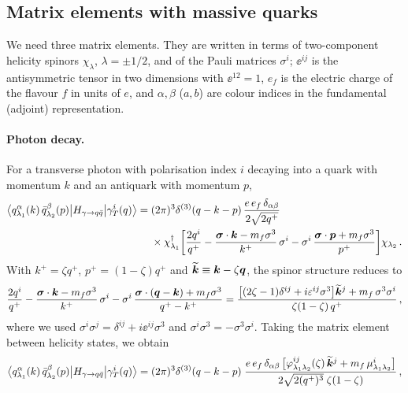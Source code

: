 \subsection{Matrix elements with massive quarks}
\label{sec:me}

We need three matrix elements. They are written in terms of two-component helicity spinors $\chi_\lambda$,
$\lambda=\pm1/2$, and of the Pauli matrices $\sigma^i$; $\ee^{ij}$ is the antisymmetric tensor in two
dimensions with $\ee^{12}=1$, $e_f$ is the electric charge of the flavour $f$ in units of $e$, and
$\alpha,\beta$ ($a,b$) are colour indices in the fundamental (adjoint) representation.

\paragraph{Photon decay.} For a transverse photon with polarisation index $i$ decaying into a quark with
momentum $k$ and an antiquark with momentum $p$,
\begin{align}
\big\langle q^\alpha_{\lambda_1}(k)\,\bar q^\beta_{\lambda_2}(p)\big|H_{\gamma\to q\bar q}\big|\gamma_T^i(q)\big\rangle
={}&(2\pi)^3\delta^{(3)}(q-k-p)\,\frac{e\,e_f\,\delta_{\alpha\beta}}{2\sqrt{2q^+}}
\nonumber\\
&\times\chi^\dagger_{\lambda_1}\bigg[\frac{2q^i}{q^+}
-\frac{\bm\sigma\cdot\bm{k}-m_f\sigma^3}{k^+}\,\sigma^i
-\sigma^i\,\frac{\bm\sigma\cdot\bm{p}+m_f\sigma^3}{p^+}\bigg]\chi_{\lambda_2}\,.
\label{eq:Hgamma}
\end{align}
With $k^+=\zeta q^+$, $p^+=(1-\zeta)q^+$ and $\widetilde{\bm{k}}\equiv\bm{k}-\zeta\bm{q}$, the spinor structure reduces to
\begin{equation}
\frac{2q^i}{q^+}-\frac{\bm\sigma\cdot\bm{k}-m_f\sigma^3}{k^+}\,\sigma^i
-\sigma^i\,\frac{\bm\sigma\cdot(\bm{q}-\bm{k})+m_f\sigma^3}{q^+-k^+}
=\frac{\big[(2\zeta-1)\delta^{ij}+i\varepsilon^{ij}\sigma^3\big]\widetilde{\bm{k}}^j+m_f\,\sigma^3\sigma^i}{\zeta(1-\zeta)\,q^+}\,,
\end{equation}
where we used $\sigma^i\sigma^j=\delta^{ij}+i\ee^{ij}\sigma^3$ and $\sigma^i\sigma^3=-\sigma^3\sigma^i$.
Taking the matrix element between helicity states, we obtain
\begin{align}
\big\langle q^\alpha_{\lambda_1}(k)\,\bar q^\beta_{\lambda_2}(p)\big|H_{\gamma\to q\bar q}\big|\gamma_T^i(q)\big\rangle
=(2\pi)^3\delta^{(3)}(q-k-p)\;
\frac{e\,e_f\,\delta_{\alpha\beta}\,\big[\varphi^{ij}_{\lambda_1\lambda_2}(\zeta)\,\widetilde{\bm{k}}^j
+m_f\,\mu^i_{\lambda_1\lambda_2}\big]}{2\sqrt{2(q^+)^3}\;\zeta(1-\zeta)}\,,
\label{eq:Hgamma2}
\end{align}
